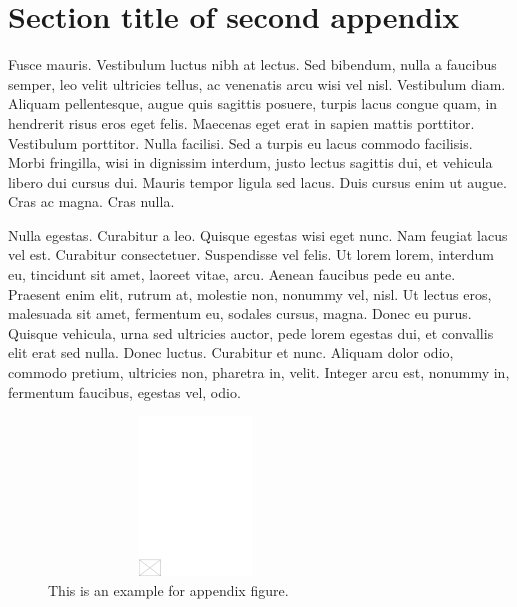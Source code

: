 \documentclass[APA,LATO1COL]{WileyNJD-v2}
\begin{document}
\section{Section title of second appendix\label{app2}}%

Fusce mauris. Vestibulum luctus nibh at lectus. Sed bibendum, nulla a faucibus semper, leo velit ultricies tellus, ac
venenatis arcu wisi vel nisl. Vestibulum diam. Aliquam pellentesque, augue quis sagittis posuere, turpis lacus congue
quam, in hendrerit risus eros eget felis. Maecenas eget erat in sapien mattis porttitor. Vestibulum porttitor. Nulla
facilisi. Sed a turpis eu lacus commodo facilisis. Morbi fringilla, wisi in dignissim interdum, justo lectus sagittis dui, et
vehicula libero dui cursus dui. Mauris tempor ligula sed lacus. Duis cursus enim ut augue. Cras ac magna. Cras nulla.

Nulla egestas. Curabitur a leo. Quisque egestas wisi eget nunc. Nam feugiat lacus vel est. Curabitur consectetuer.
Suspendisse vel felis. Ut lorem lorem, interdum eu, tincidunt sit amet, laoreet vitae, arcu. Aenean faucibus pede eu
ante. Praesent enim elit, rutrum at, molestie non, nonummy vel, nisl. Ut lectus eros, malesuada sit amet, fermentum
eu, sodales cursus, magna. Donec eu purus. Quisque vehicula, urna sed ultricies auctor, pede lorem egestas dui, et
convallis elit erat sed nulla. Donec luctus. Curabitur et nunc. Aliquam dolor odio, commodo pretium, ultricies non,
pharetra in, velit. Integer arcu est, nonummy in, fermentum faucibus, egestas vel, odio.

\begin{figure}[t]
\centerline{\includegraphics[height=10pc,width=78mm,draft]{empty}}
\caption{This is an example for appendix figure.\label{fig5}}
\end{figure}
\end{document}
